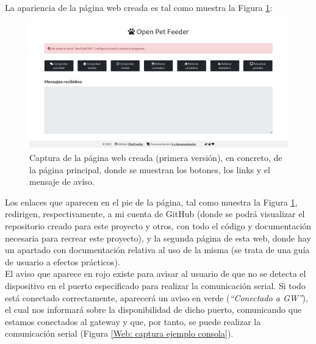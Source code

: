 \documentclass[12pt]{article}
\begin{document}
	\noindent La apariencia de la página web creada es tal como muestra la Figura \ref{Web: captura pagina principal}: \\
	
	\pagebreak
	
	\begin{figure}[h!]
		\begin{center}
			\includegraphics[width=1\textwidth]{img/captura_web_1.png}
			\caption{Captura de la página web creada (primera versión), en concreto, de la página principal, donde se muestran los botones, los links y el mensaje de aviso.}
			\label{Web: captura pagina principal}
		\end{center}
	\end{figure}
	
	\noindent Los enlaces que aparecen en el pie de la página, tal como muestra la Figura \ref{Web: captura pagina principal}, redirigen, respectivamente, a mi cuenta de GitHub (donde se podrá visualizar el repositorio creado para este proyecto y otros, con todo el código y documentación necesaria para recrear este proyecto), y la segunda página de esta web, donde hay un apartado con documentación relativa al uso de la misma (se trata de una guía de usuario a efectos prácticos). \\
	
	\noindent El aviso que aparece en rojo existe para avisar al usuario de que no se detecta el dispositivo en el puerto especificado para realizar la comunicación serial. Si todo está conectado correctamente, aparecerá un aviso en verde (\textit{``Conectado a GW''}), el cual nos informará sobre la disponibilidad de dicho puerto, comunicando que estamos conectados al gateway y que, por tanto, se puede realizar la comunicación serial (Figura \ref{Web: captura ejemplo consola}). \\
	
	\pagebreak
	
\end{document}

